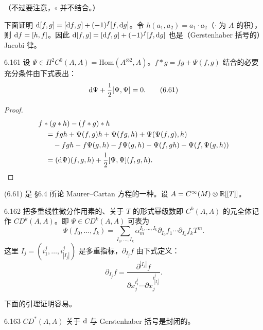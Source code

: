 
（不过要注意，$\circ$ 并不结合。）

下面证明 $\mathrm{d}[f,g]=[\mathrm{d} f,g]+(-1)^f[f,\mathrm{d} g]$。令 $h(a_1,a_2)=a_1\cdot a_2$（$\cdot$ 为 $A$ 的积），则 $\mathrm{d} f=[h,f]$。因此 $\mathrm{d}[f,g]=[\mathrm{d} f,g]+(-1)^f[f,\mathrm{d} g]$ 也是（Gerstenhaber 括号的）Jacobi 律。

\begin{lemma*}{6.161}
  设 $\Psi\in\Pi^2C^0(A,A)=\mathrm{Hom}(A^{\otimes2},A)$。$f*g=fg+\Psi(f,g)$ 结合的必要充分条件由下式表出：
  \begin{equation}
    \mathrm{d}\Psi+\frac12[\Psi,\Psi]=0. \tag{6.61}
  \end{equation}
\end{lemma*}
\begin{proof}
  \begin{align*}
    &f*(g*h)-(f*g)*h\\
    &\quad=fgh+\Psi(f,g)h+\Psi(fg,h)+\Psi(\Psi(f,g),h)\\
    &\qquad-fgh-f\Psi(g,h)-f\Psi(g,h)-\Psi(f,gh)-\Psi(f,\Psi(g,h))\\
    &\quad=(\mathrm{d}\Psi)(f,g,h)+\frac12[\Psi,\Psi](f,g,h).
  \end{align*}
\end{proof}

(6.61) 是 §6.4 所论 Maurer–Cartan 方程的一种。设 $A=C^\infty(M)\otimes\mathbb{R}[[T]]$。

\begin{definition}{6.162}
  把多重线性微分作用素的、关于 $T$ 的形式幂级数即 $C^k(A,A)$ 的元全体记作 $CD^k(A,A)$。即 $\Psi\in CD^k(A,A)$ 可表为
  \[
    \Psi(f_0,\dots,f_k)=\sum_{I_0,\dots,I_k}\alpha^{I_1,\dots,I_k}_m\partial_{I_0}f_1\cdots\partial_{I_k}f_kT^m.
  \]
  这里 $I_j=(i^j_1,\dots,i^j_{|I_j|})$ 是多重指标，$\partial_{I_j}f$ 由下式定义：
  \[
    \partial_{I_j}f=\frac{\partial^{|I_j|}f}{\partial x^{i^j_1}_j\cdots\partial x^{i^j_{|I_j|}}_j}.
  \]
\end{definition}

下面的引理证明容易。

\begin{lemma}{6.163}
  $CD^*(A,A)$ 关于 $\mathrm{d}$ 与 Gerstenhaber 括号是封闭的。
\end{lemma}

